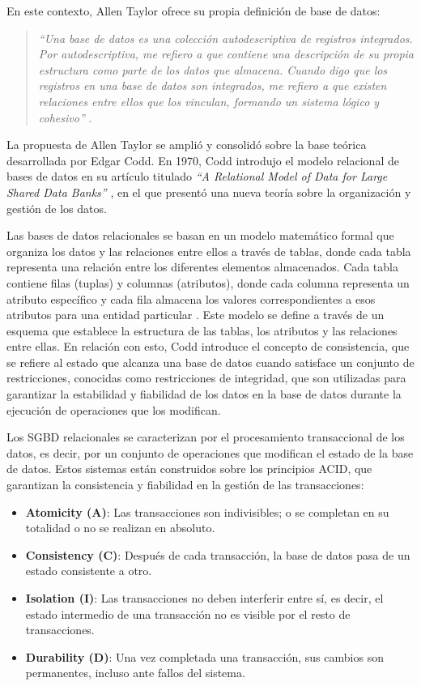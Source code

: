 En este contexto, Allen Taylor ofrece su propia definición de base de datos:

\begin{quote}
    \textit{“Una base de datos es una colección autodescriptiva de registros integrados. Por autodescriptiva, me refiero a que contiene una descripción de su propia estructura como parte de los datos que almacena. Cuando digo que los registros en una base de datos son integrados, me refiero a que existen relaciones entre ellos que los vinculan, formando un sistema lógico y cohesivo”} \cite{Taylor2001_2}.
\end{quote}

La propuesta de Allen Taylor se amplió y consolidó sobre la base teórica desarrollada por Edgar Codd. 
En 1970, Codd introdujo el modelo relacional de bases de datos en su artículo 
titulado \textit{“A Relational Model of Data for Large Shared Data Banks”} \cite{Codd1970}, 
en el que presentó una nueva teoría sobre la organización y gestión de los datos.

Las bases de datos relacionales se basan en un modelo matemático formal que organiza 
los datos y las relaciones entre ellos a través de tablas, donde cada tabla representa 
una relación entre los diferentes elementos almacenados. Cada tabla contiene filas 
(tuplas) y columnas (atributos), donde cada columna representa un atributo específico y 
cada fila almacena los valores correspondientes a esos atributos para una entidad 
particular \cite{Chen2016}. Este modelo se define a través de un esquema que establece 
la estructura de las tablas, los atributos y las relaciones entre ellas. 
En relación con esto, Codd introduce el concepto de consistencia, que se refiere al 
estado que alcanza una base de datos cuando satisface un conjunto de restricciones, 
conocidas como restricciones de integridad, que son utilizadas para garantizar la 
estabilidad y fiabilidad de los datos en la base de datos durante la ejecución de 
operaciones que los modifican.

Los SGBD relacionales se caracterizan por el procesamiento transaccional de los datos, 
es decir, por un conjunto de operaciones que modifican el estado de la base de datos. 
Estos sistemas están construidos sobre los principios ACID, que garantizan la 
consistencia y fiabilidad en la gestión de las transacciones:

\begin{itemize}
    \item \textbf{Atomicity (A)}: Las transacciones son indivisibles; o se completan 
    en su totalidad o no se realizan en absoluto.
    \item \textbf{Consistency (C)}: Después de cada transacción, la base de datos 
    pasa de un estado consistente a otro.
    \item \textbf{Isolation (I)}: Las transacciones no deben interferir entre sí, 
    es decir, el estado intermedio de una transacción no es visible por el resto de 
    transacciones.
    \item \textbf{Durability (D)}: Una vez completada una transacción, sus cambios 
    son permanentes, incluso ante fallos del sistema.
\end{itemize}


